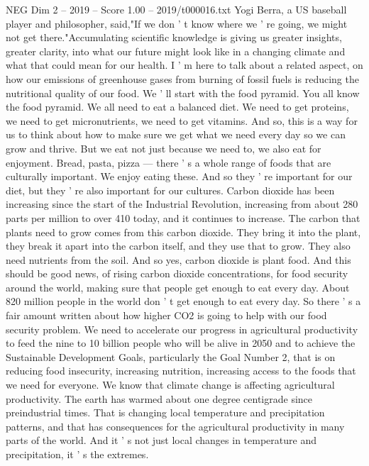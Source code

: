 \begin{textsample}{NEG Dim 2 – 2019 – Score 1.00 – 2019/t000016.txt}  \label{ex:f2_neg_059}
Yogi Berra, a US baseball player and philosopher, said,"If we don ' t know where we ' re going, we might not get there."Accumulating scientific knowledge is giving us greater insights, greater clarity, into what our future might look like in a changing climate and what that could mean for our health.
I ' m here to talk about a related aspect, on how our emissions of greenhouse gases from burning of fossil fuels is reducing the nutritional quality of our food.
We ' ll start with the food pyramid.
You all know the food pyramid.
We all need to eat a balanced diet.
We need to get proteins, we need to get micronutrients, we need to get vitamins.
And so, this is a way for us to think about how to make sure we get what we need every day so we can grow and thrive.
But we eat not just because we need to, we also eat for enjoyment.
Bread, pasta, pizza — there ' s a whole range of foods that are culturally important.
We enjoy eating these.
And so they ' re important for our diet, but they ' re also important for our cultures.
Carbon dioxide has been increasing since the start of the Industrial Revolution, increasing from about 280 parts per million to over 410 today, and it continues to increase.
The carbon that plants need to grow comes from this carbon dioxide.
They bring it into the plant, they break it apart into the carbon itself, and they use that to grow.
They also need nutrients from the soil.
And so yes, carbon dioxide is plant food.
And this should be good news, of rising carbon dioxide concentrations, for food security around the world, making sure that people get enough to eat every day.
About 820 million people in the world don ' t get enough to eat every day.
So there ' s a fair amount written about how higher CO2 is going to help with our food security problem.
We need to accelerate our progress in agricultural productivity to feed the nine to 10 billion people who will be alive in 2050 and to achieve the Sustainable Development Goals, particularly the Goal Number 2, that is on reducing food insecurity, increasing nutrition, increasing access to the foods that we need for everyone.
We know that climate change is affecting agricultural productivity.
The earth has warmed about one degree centigrade since preindustrial times.
That is changing local temperature and precipitation patterns, and that has consequences for the agricultural productivity in many parts of the world.
And it ' s not just local changes in temperature and precipitation, it ' s the extremes.

\end{textsample}
